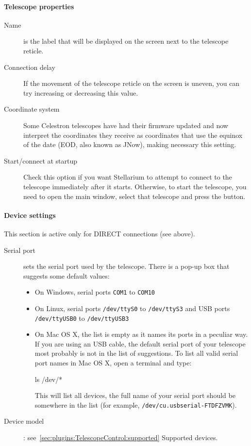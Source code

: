 \paragraph{Telescope properties}

\begin{description}
\item[Name] is the label that will be displayed on the screen next to
  the telescope reticle.
\item[Connection delay] If the movement of the telescope reticle on
  the screen is uneven, you can try increasing or decreasing this
  value.
\item[Coordinate system] Some Celestron telescopes have had their
  firmware updated and now interpret the coordinates they receive as
  coordinates that use the equinox of the date (EOD, also known as
  JNow), making necessary this setting.
\item[Start/connect at startup] Check this option if you want
  Stellarium to attempt to connect to the telescope immediately after
  it starts. Otherwise, to start the telescope, you need to open the
  main window, select that telescope and press the 
  button.
\end{description}

\paragraph{Device settings}
This section is active only for DIRECT connections (see above).

\begin{description}
\item[Serial port] sets the serial port used by the telescope.  There
  is a pop-up box that suggests some default values:
  \begin{itemize}
  \item On Windows, serial ports \texttt{COM1} to \texttt{COM10}
  \item On Linux, serial ports \texttt{/dev/ttyS0} to
    \texttt{/dev/ttyS3} and USB ports \texttt{/dev/ttyUSB0} to
    \texttt{/dev/ttyUSB3}
  \item On Mac OS X, the list is empty as it names its ports in a
    peculiar way.
  If you are using an USB cable, the default serial port of your
  telescope most probably is not in the list of suggestions.  To list
  all valid serial port names in Mac OS X, open a terminal and type:

\begin{commands}
  ls /dev/*
\end{commands}
%
This will list all devices, the full name of your serial port should
be somewhere in the list (for example,
\texttt{/dev/cu.usbserial-FTDFZVMK}).
\end{itemize}

\item[Device model]: see~\ref{sec:plugins:TelescopeControl:supported} Supported devices.
\end{description}


